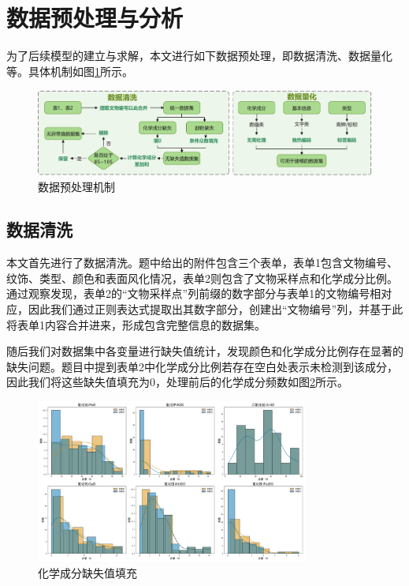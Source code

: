 
\section{数据预处理与分析}

为了后续模型的建立与求解，本文进行如下数据预处理，即数据清洗、数据量化等。具体机制如图\ref{fig:数据预处理机制}所示。

\begin{figure}[htbp]
	\centering
	\includegraphics[width=\textwidth]{figs/2模型准备/数据预处理图.pdf}
	\caption{数据预处理机制}
	\label{fig:数据预处理机制}
\end{figure}

\subsection{数据清洗}

本文首先进行了数据清洗。题中给出的附件包含三个表单，表单1包含文物编号、纹饰、类型、颜色和表面风化情况，表单2则包含了文物采样点和化学成分比例。通过观察发现，表单2的“文物采样点”列前缀的数字部分与表单1的文物编号相对应，因此我们通过正则表达式提取出其数字部分，创建出“文物编号”列，并基于此将表单1内容合并进来，形成包含完整信息的数据集。

随后我们对数据集中各变量进行缺失值统计，发现颜色和化学成分比例存在显著的缺失问题。题目中提到表单2中化学成分比例若存在空白处表示未检测到该成分，因此我们将这些缺失值填充为0，处理前后的化学成分频数如图\ref{fig:缺失值填充}所示。

\begin{figure}[htbp]
	\centering
	\includegraphics[width=0.8\textwidth]{figs/2模型准备/化学成分缺失值填充.png}
	\caption{化学成分缺失值填充}
	\label{fig:缺失值填充}
\end{figure}

